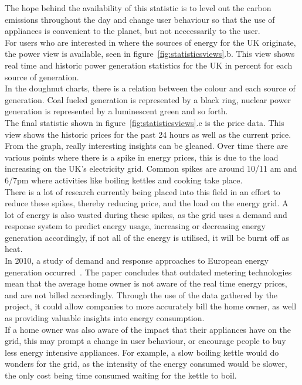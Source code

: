 \documentclass[preprint,12pt,3p]{elsarticle}
\begin{document}
The hope behind the availability of this statistic is to level out the carbon emissions throughout the day and change user behaviour so that the use of appliances is convenient to the planet, but not neccessarily to the user.\\
For users who are interested in where the sources of energy for the UK originate, the power view is available, seen in figure~\ref{fig:statisticsviews}.b. This view shows real time and historic power generation statistics for the UK in percent for each source of generation.\\
In the doughnut charts, there is a relation between the colour and each source of generation. Coal fueled generation is represented by a black ring, nuclear power generation is represented by a luminescent green and so forth.\\
The final statistic shown in figure~\ref{fig:statisticsviews}.c is the price data. This view shows the historic prices for the past 24 hours as well as the current price.\\
From the graph, really interesting insights can be gleaned. Over time there are various points where there is a spike in energy prices, this is due to the load increasing on the UK's electricity grid. Common spikes are around 10/11 am and 6/7pm where activities like boiling kettles and cooking take place.\\
There is a lot of research currently being placed into this field in an effort to reduce these spikes, thereby reducing price, and the load on the energy grid. A lot of energy is also wasted during these spikes, as the grid uses a demand and response system to predict energy usage, increasing or decreasing energy generation accordingly, if not all of the energy is utilised, it will be burnt off as heat.\\
In 2010, a study of demand and response approaches to European energy generation occurred~\cite{demandresponse}. The paper concludes that outdated metering technologies mean that the average home owner  is not aware of the real time energy prices, and are not billed accordingly. Through the use of the data gathered by the project, it could allow companies to more accurately bill the home owner, as well as providing valuable insights into energy consumption.\\
If a home owner was also aware of the impact that their appliances have on the grid, this may prompt a change in user behaviour, or encourage people to buy less energy intensive appliances. For example, a slow boiling kettle would do wonders for the grid, as the intensity of the energy consumed would be slower, the only cost being time consumed waiting for the kettle to boil.
\end{document}
